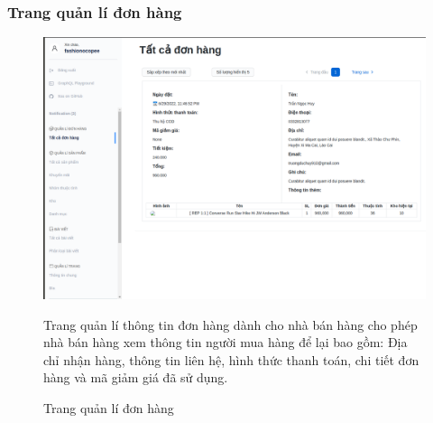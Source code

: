 \subsubsection{Trang quản lí đơn hàng}
\FloatBarrier
\begin{figure}[!htbp]\fontsize{13px}{13px}\selectfont
\centering
\includegraphics[width=\textwidth]{./results/order}
\caption{Trang quản lí đơn hàng}
\justifying
Trang quản lí thông tin đơn hàng dành cho nhà bán hàng cho phép nhà bán hàng xem thông tin người mua hàng để lại bao gồm: Địa chỉ nhận hàng, thông tin liên hệ, hình thức thanh toán, chi tiết đơn hàng và mã giảm giá đã sử dụng.
\end{figure}
\clearpage
